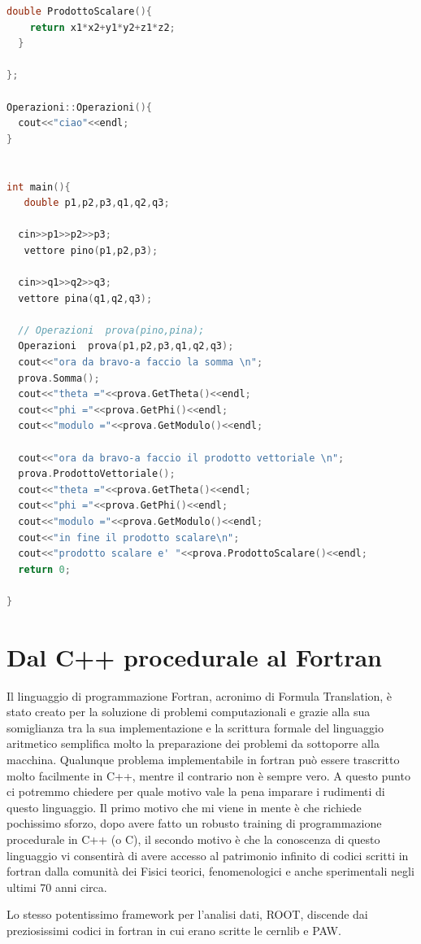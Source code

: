 \documentclass[11pt,fleqn]{book} %
\begin{document}
\begin{lstlisting}[language=c++]
  double ProdottoScalare(){
    return x1*x2+y1*y2+z1*z2;
  }
  
};

Operazioni::Operazioni(){
  cout<<"ciao"<<endl;
}


int main(){
   double p1,p2,p3,q1,q2,q3;
   
  cin>>p1>>p2>>p3;
   vettore pino(p1,p2,p3);
 
  cin>>q1>>q2>>q3;
  vettore pina(q1,q2,q3);
  
  // Operazioni  prova(pino,pina);
  Operazioni  prova(p1,p2,p3,q1,q2,q3);
  cout<<"ora da bravo-a faccio la somma \n";
  prova.Somma();
  cout<<"theta ="<<prova.GetTheta()<<endl;
  cout<<"phi ="<<prova.GetPhi()<<endl;
  cout<<"modulo ="<<prova.GetModulo()<<endl;
  
  cout<<"ora da bravo-a faccio il prodotto vettoriale \n";
  prova.ProdottoVettoriale();    
  cout<<"theta ="<<prova.GetTheta()<<endl;
  cout<<"phi ="<<prova.GetPhi()<<endl;
  cout<<"modulo ="<<prova.GetModulo()<<endl;
  cout<<"in fine il prodotto scalare\n";
  cout<<"prodotto scalare e' "<<prova.ProdottoScalare()<<endl;
  return 0;
  
}
\end{lstlisting} 



\chapter{Dal C++ procedurale al Fortran}
Il linguaggio di programmazione Fortran, acronimo di Formula Translation, è stato creato per la soluzione di problemi computazionali e grazie alla sua somiglianza tra la sua implementazione e la scrittura formale del linguaggio aritmetico semplifica molto la preparazione dei problemi da sottoporre alla macchina. Qualunque problema implementabile in fortran può essere trascritto molto facilmente in C++, mentre il contrario non è sempre vero. A questo punto ci potremmo chiedere per quale motivo vale la pena imparare i rudimenti di questo linguaggio. Il primo motivo che mi viene in mente è che richiede pochissimo sforzo, dopo avere fatto un robusto training di programmazione procedurale in C++ (o C), il secondo motivo è che la conoscenza di questo linguaggio vi consentirà di avere accesso al patrimonio infinito di codici scritti in fortran dalla comunità dei Fisici  teorici, fenomenologici e anche sperimentali negli ultimi 70 anni circa. 

Lo stesso potentissimo framework per l'analisi dati, ROOT, discende dai preziosissimi codici in fortran in cui erano scritte le cernlib e PAW.
\end{document}
